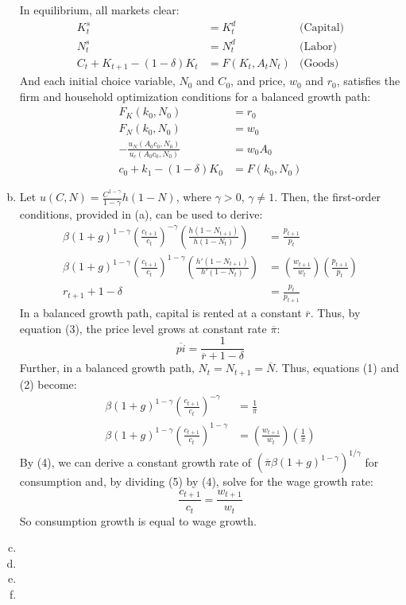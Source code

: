 \documentclass{article}
\begin{document}
\begin{enumerate}[(a)]
		In equilibrium, all markets clear:
		\begin{align*}
			K_t^s &= K_t^d									&\text{(Capital)}	\\
			N_t^s &= N_t^d 									&\text{(Labor)}		\\
			C_t + K_{t+1} - (1-\delta)K_t &= F(K_t,A_tN_t)	&\text{(Goods)}
		\end{align*}
		And each initial choice variable, $N_0$ and $C_0$, and price, $w_0$ and $r_0$, satisfies the firm and household optimization conditions for a balanced growth path:
		\begin{align*}
			F_K(k_0,N_0) &= r_0									\\
			F_N(k_0,N_0) &= w_0									\\
			-\frac{u_N(A_0c_0,N_0)}{u_c(A_0c_0,N_0)} &= w_0A_0	\\
			c_0 + k_{1} - (1-\delta)K_0 &= F(k_0,N_0)
		\end{align*}
	
	\item Let $u(C,N) = \frac{C^{1-\gamma}}{1-\gamma}h(1-N)$, where $\gamma>0$, $\gamma\neq 1$. Then, the first-order conditions, provided in (a), can be used to derive:
		\begin{align}
			\beta(1+g)^{1-\gamma}\left(\frac{c_{t+1}}{c_t}\right)^{-\gamma}\left(\frac{h(1-N_{t+1})}{h(1-N_t)}\right) &= \frac{p_{t+1}}{p_t}	\\
			\beta(1+g)^{1-\gamma}\left(\frac{c_{t+1}}{c_t}\right)^{1-\gamma}\left(\frac{h'(1-N_{t+1})}{h'(1-N_t)}\right) &= \left(\frac{w_{t+1}}{w_t}\right)\left(\frac{p_{t+1}}{p_t}\right)	\\
			r_{t+1} + 1 - \delta &= \frac{p_t}{p_{t+1}}
		\end{align}
		In a balanced growth path, capital is rented at a constant $\overline{r}$. Thus, by equation (3), the price level grows at constant rate $\overline{\pi}$:
			\[
				\overline{pi} = \frac{1}{\overline{r} + 1 - \delta}
			\]
		Further, in a balanced growth path, ${N_t=N_{t+1}=\overline{N}}$. Thus, equations (1) and (2) become:
		\begin{align}
			\beta(1+g)^{1-\gamma}\left(\frac{c_{t+1}}{c_t}\right)^{-\gamma} &= \frac{1}{\overline{\pi}}	\\
			\beta(1+g)^{1-\gamma}\left(\frac{c_{t+1}}{c_t}\right)^{1-\gamma} &= \left(\frac{w_{t+1}}{w_t}\right)\left(\frac{1}{\overline{\pi}}\right)	
		\end{align}
		By (4), we can derive a constant growth rate of ${\left(\overline{\pi}\beta(1+g)^{1-\gamma}\right)^{1/\gamma}}$ for consumption and, by dividing (5) by (4), solve for the wage growth rate:
		\[
			\frac{c_{t+1}}{c_t} = \frac{w_{t+1}}{w_t}
		\]
		So consumption growth is equal to wage growth.
		
		
	\item 
	
	\item 
	
	\item 
	
	\item 
	
\end{enumerate}
\end{document}
